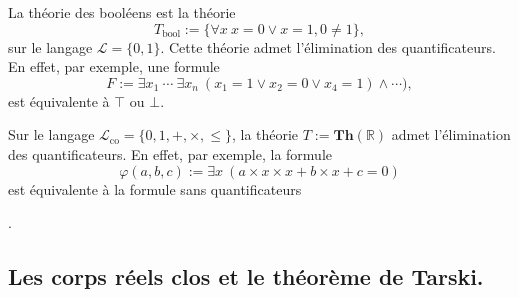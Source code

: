 \documentclass[./main]{subfiles}
\begin{document}
  \begin{exm}
    La théorie des booléens est la théorie \[
    T_\mathrm{bool} := \{\forall x \: x = 0 \lor x = 1 , 0 \neq 1\} 
    ,\] 
    sur le langage $\mathcal{L} = \{0,1\}$.
    Cette théorie admet l'élimination des quantificateurs. En effet, par exemple, une formule \[
    F := \exists x_1 \: \cdots  \: \exists x_n \: (x_1 = 1 \lor x_2 = 0 \lor x_4 = 1) \land \cdots)
    ,\] est équivalente à $\top$ ou $\bot$.
  \end{exm}

  \begin{exm}
    Sur le langage $\mathcal{L}_\mathrm{co} = \{0, 1, +, \times, \le\}$, la théorie $T := \mathbf{Th}(\mathds{R})$ admet l'élimination des quantificateurs.
    En effet, par exemple, la formule \[
    \varphi(a, b,c ) := \exists x \: (a \times x \times x + b \times x + c = 0)
    \] est équivalente à la formule sans quantificateurs 

    .
  \end{exm}

  \subsection{Les corps réels clos et le théorème de Tarski.}
\end{document}
